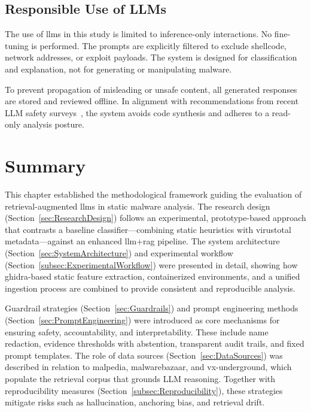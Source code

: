 \subsection{Responsible Use of LLMs}
The use of \glspl{llm} in this study is limited to inference-only interactions. No fine-tuning is
performed. The prompts are explicitly filtered to exclude shellcode, network addresses, or exploit
payloads. The system is designed for classification and explanation, not for generating or
manipulating malware.

To prevent propagation of misleading or unsafe content, all generated responses are stored and
reviewed offline. In alignment with recommendations from recent LLM safety
surveys~\cite{ferrag2024allinsights, metta2024generativeai}, the system avoids code synthesis and
adheres to a read-only analysis posture.

\section{Summary}\label{sec:MethodologySummary}
This chapter established the methodological framework guiding the evaluation of retrieval-augmented
\glspl{llm} in static malware analysis. The research design (Section~\ref{sec:ResearchDesign})
follows an experimental, prototype-based approach that contrasts a baseline classifier—combining
static heuristics with \gls{virustotal} metadata—against an enhanced \gls{llm}+\gls{rag} pipeline.
The system architecture (Section~\ref{sec:SystemArchitecture}) and experimental workflow
(Section~\ref{subsec:ExperimentalWorkflow}) were presented in detail, showing how
\gls{ghidra}-based static feature extraction, containerized environments, and a unified ingestion
process are combined to provide consistent and reproducible analysis.

Guardrail strategies (Section~\ref{sec:Guardrails}) and prompt engineering methods
(Section~\ref{sec:PromptEngineering}) were introduced as core mechanisms for ensuring safety,
accountability, and interpretability. These include name redaction, evidence thresholds with
abstention, transparent audit trails, and fixed prompt templates. The role of data sources
(Section~\ref{sec:DataSources}) was described in relation to \gls{malpedia}, \gls{malwarebazaar},
and \gls{vx-underground}, which populate the retrieval corpus that grounds LLM reasoning. Together
with reproducibility measures (Section~\ref{subsec:Reproducibility}), these strategies mitigate
risks such as hallucination, anchoring bias, and retrieval drift.

